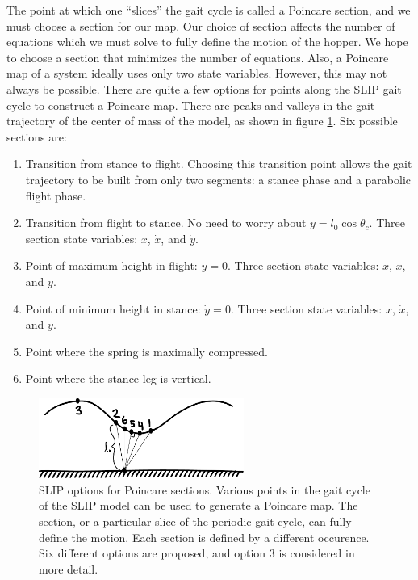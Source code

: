 The point at which one ``slices'' the gait cycle is called a Poincare section,
and we must choose a section for our map. Our choice of section affects the
number of equations which we must solve to fully define the motion of the
hopper. We hope to choose a section that minimizes the number of equations.
Also, a Poincare map of a system ideally uses only two state variables.
However, this may not always be possible.  There are quite a few options for
points along the SLIP gait cycle to construct a Poincare map. There are peaks
and valleys in the gait trajectory of the center of mass of the model, as shown
in figure \ref{fig:SLIPSections}.   Six possible sections are:

\begin{enumerate}

\item Transition from stance to flight. Choosing this transition point allows
    the gait trajectory to be built from only two segments: a stance phase and
    a parabolic flight phase. 

\item Transition from flight to stance. No need to worry about
    $y=l_{0}\cos{\theta_{c}}$.  Three section state variables: $x$, $\dot{x}$, and
    $\dot{y}$.

\item Point of maximum height in flight: $\dot{y}=0$. Three section state variables: $x$, $\dot{x}$, and $y$.
\label{item:MaxHeight}

\item Point of minimum height in stance: $\dot{y}=0$. Three section state variables: $x$, $\dot{x}$, and $y$.

\item Point where the spring is maximally compressed. 

\item Point where the stance leg is vertical.

\end{enumerate}

\begin{figure}[h]		%
\begin{centering}
\includegraphics[width=0.6\textwidth]{Figures/SLIPSections}\par
\end{centering}
\caption[Diagram: SLIP Options for Poincare Sections]{SLIP options for Poincare sections. Various points in the gait cycle of the SLIP model can be used to generate a Poincare map. The section, or a particular slice of the periodic gait cycle, can fully define the motion. Each section is defined by a different occurence. Six different options are proposed, and option 3 is considered in more detail.}
\label{fig:SLIPSections}
\end{figure}
%


